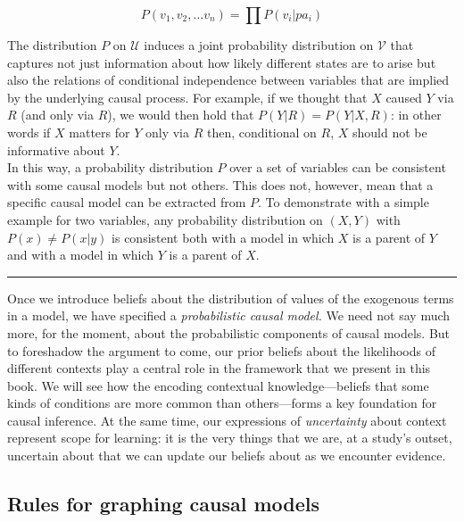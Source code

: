 \documentclass[12pt,]{book}
\begin{document}
\begin{equation} 
P(v_1,v_2,\dots v_n) = \prod P(v_i|pa_i)
\label{eq:markov}
\end{equation}

The distribution \(P\) on \(\mathcal{U}\) induces a joint probability distribution on \(\mathcal{V}\) that captures not just information about how likely different states are to arise but also the relations of conditional independence between variables that are implied by the underlying causal process. For example, if we thought that \(X\) caused \(Y\) via \(R\) (and only via \(R\)), we would then hold that \(P(Y | R) = P(Y | X, R)\): in other words if \(X\) matters for \(Y\) only via \(R\) then, conditional on \(R\), \(X\) should not be informative about \(Y\).\\
In this way, a probability distribution \(P\) over a set of variables can be consistent with some causal models but not others. This does not, however, mean that a specific causal model can be extracted from \(P\). To demonstrate with a simple example for two variables, any probability distribution on \((X,Y)\) with \(P(x)\neq P(x|y)\) is consistent both with a model in which \(X\) is a parent of \(Y\) and with a model in which \(Y\) is a parent of \(X\).

\begin{center}\rule{0.5\linewidth}{\linethickness}\end{center}

Once we introduce beliefs about the distribution of values of the exogenous terms in a model, we have specified a \emph{probabilistic causal model.} We need not say much more, for the moment, about the probabilistic components of causal models. But to foreshadow the argument to come, our prior beliefs about the likelihoods of different contexts play a central role in the framework that we present in this book. We will see how the encoding contextual knowledge---beliefs that some kinds of conditions are more common than others---forms a key foundation for causal inference. At the same time, our expressions of \emph{uncertainty} about context represent scope for learning: it is the very things that we are, at a study's outset, uncertain about that we can update our beliefs about as we encounter evidence.

\hypertarget{rules-for-graphing-causal-models}{%
\subsection{Rules for graphing causal models}\label{rules-for-graphing-causal-models}}
\end{document}
